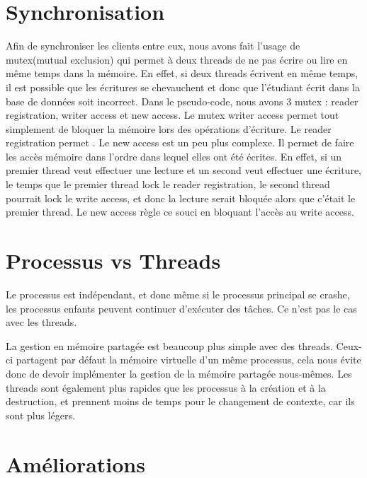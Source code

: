 \documentclass[utf8]{article}
\begin{document}
\section{Synchronisation}
\par
\indent


Afin de synchroniser les clients entre eux, nous avons fait l'usage de
mutex(mutual exclusion) qui permet à deux threads de ne pas écrire ou lire en
même temps dans la mémoire. En effet, si deux threads écrivent en même temps, il
est possible que les écritures se chevauchent et donc que l'étudiant écrit dans
la base de données soit incorrect.
\newline
Dans le pseudo-code, nous avons 3 mutex : reader registration, writer access et
new access. Le mutex writer access permet tout simplement de bloquer la mémoire
lors des opérations d'écriture. Le reader registration permet . Le new access
est un peu plus complexe. Il permet de faire les accès mémoire dans l'ordre dans
lequel elles ont été écrites. En effet, si un premier thread veut effectuer une
lecture et un second veut effectuer une écriture, le temps que le premier thread
lock le reader registration, le second thread pourrait lock le write access, et
donc la lecture serait bloquée alors que c'était le premier thread. Le new
access règle ce souci en bloquant l'accès au write access.
\par
\section{Processus vs Threads}
\par
\indent

Le processus est indépendant, et donc même si le processus principal se crashe,
les processus enfants peuvent continuer d'exécuter des tâches. Ce n'est pas le
cas avec les threads.

La gestion en mémoire partagée est beaucoup plus simple avec des threads.
Ceux-ci partagent par défaut la mémoire virtuelle d'un même processus, cela nous
évite donc de devoir implémenter la gestion de la mémoire partagée nous-mêmes.
Les threads sont également plus rapides que les processus à la création et à la
destruction, et prennent moins de temps pour le changement de contexte, car ils
sont plus légers.\newline



\par
\section{Améliorations}
\par
\indent
\end{document}
